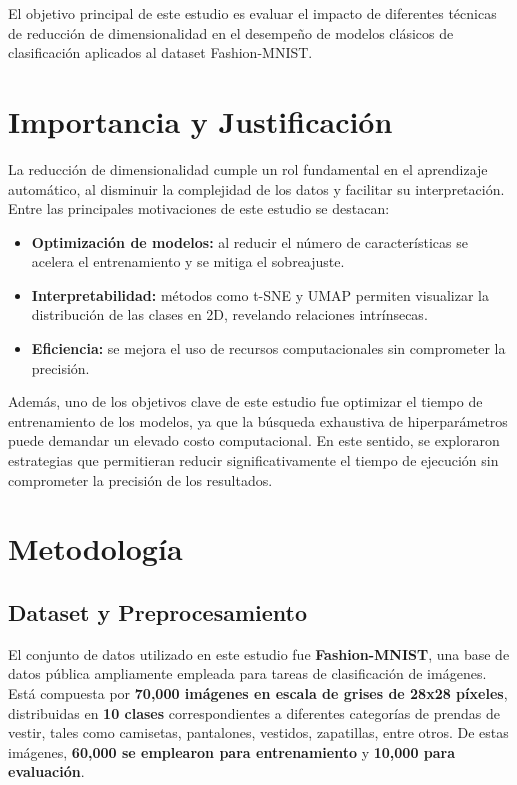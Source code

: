 \documentclass[conference]{IEEEtran}
\begin{document}
El objetivo principal de este estudio es evaluar el impacto de diferentes técnicas de reducción de dimensionalidad en el desempeño de modelos clásicos de clasificación aplicados al dataset Fashion-MNIST.

\section{Importancia y Justificación}
La reducción de dimensionalidad cumple un rol fundamental en el aprendizaje automático, al disminuir la complejidad de los datos y facilitar su interpretación. 
Entre las principales motivaciones de este estudio se destacan:

\begin{itemize}
    \item \textbf{Optimización de modelos:} al reducir el número de características se acelera el entrenamiento y se mitiga el sobreajuste.
    \item \textbf{Interpretabilidad:} métodos como t-SNE y UMAP permiten visualizar la distribución de las clases en 2D, revelando relaciones intrínsecas.
    \item \textbf{Eficiencia:} se mejora el uso de recursos computacionales sin comprometer la precisión.
\end{itemize}
Además, uno de los objetivos clave de este estudio fue optimizar el tiempo de entrenamiento de los modelos, ya que la búsqueda exhaustiva de hiperparámetros puede demandar un elevado costo computacional. En este sentido, se exploraron estrategias que permitieran reducir significativamente el tiempo de ejecución sin comprometer la precisión de los resultados.


\section{Metodología}
\subsection{Dataset y Preprocesamiento}

El conjunto de datos utilizado en este estudio fue \textbf{Fashion-MNIST}, una base de datos pública ampliamente empleada para tareas de clasificación de imágenes. Está compuesta por \textbf{70,000 imágenes en escala de grises de 28x28 píxeles}, distribuidas en \textbf{10 clases} correspondientes a diferentes categorías de prendas de vestir, tales como camisetas, pantalones, vestidos, zapatillas, entre otros. De estas imágenes, \textbf{60,000 se emplearon para entrenamiento} y \textbf{10,000 para evaluación}.
\end{document}
